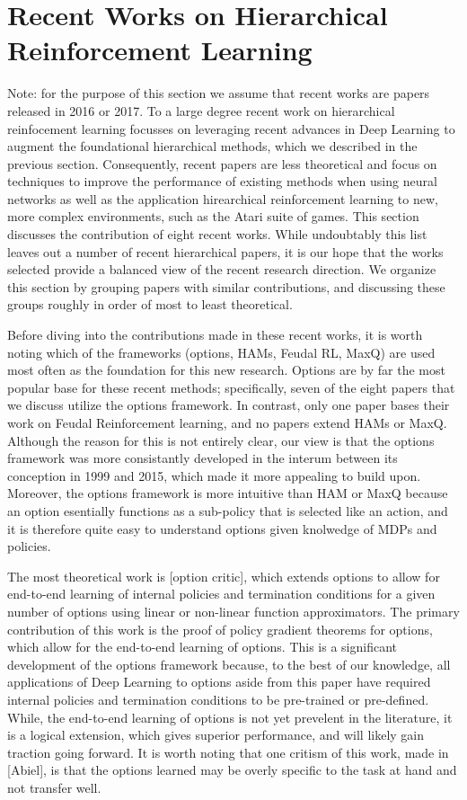 \section{Recent Works on Hierarchical Reinforcement Learning}
Note: for the purpose of this section we assume that recent works are papers released in 2016 or 2017.
To a large degree recent work on hierarchical reinfocement learning focusses on leveraging recent advances in
Deep Learning to augment the foundational hierarchical methods, which we described in the previous section.
Consequently, recent papers are less theoretical and focus on techniques to improve the performance
of existing methods when using neural networks as well as the application hirearchical reinforcement learning
to new, more complex environments, such as the Atari suite of games.
This section discusses the contribution of eight recent works. While undoubtably this list leaves out a number
of recent hierarchical papers, it is our hope that the works selected provide a balanced view of the recent
research direction. We organize this section by grouping papers with similar contributions, and discussing
these groups roughly in order of most to least theoretical.

Before diving into the contributions made in these recent works, it is worth noting which of the frameworks
(options, HAMs, Feudal RL, MaxQ) are used most often as the foundation for this new research.
Options are by far the most popular base for these recent methods; specifically, seven of the eight
papers that we discuss utilize the options framework. In contrast, only one paper bases their work
on Feudal Reinforcement learning, and no papers extend HAMs or MaxQ. Although the reason for this is
not entirely clear, our view is that the options framework was more consistantly developed in the interum
between its conception in 1999 and 2015, which made it more appealing to build upon. Moreover, the options
framework is more intuitive than HAM or MaxQ because an option esentially functions as a sub-policy that is
selected like an action, and it is therefore quite easy to understand options given knolwedge of MDPs and policies.

The most theoretical work is [option critic], which extends options to allow for end-to-end learning
of internal policies and termination conditions for a given number of options using
linear or non-linear function approximators. The primary contribution of this work is the proof
of policy gradient theorems for options, which allow for the end-to-end learning of options.
This is a significant development of the options framework because, to the best of our knowledge,
all applications of Deep Learning to options aside from this paper have required internal policies
and termination conditions to be pre-trained or pre-defined. While, the end-to-end learning of options
is not yet prevelent in the literature, it is a logical extension, which gives superior performance, and
will likely gain traction going forward. It is worth noting that one critism of this work,
made in [Abiel], is that the options learned may be overly specific to the task at hand and not transfer well.

